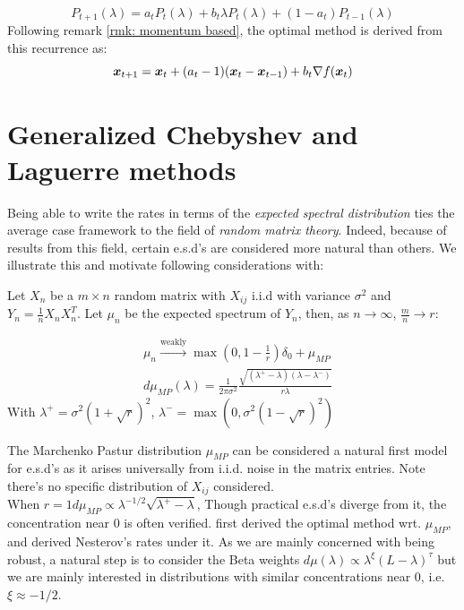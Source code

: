 \documentclass{article}
\begin{document}
\begin{equation}
    P_{t+1}(\lambda)=a_tP_t(\lambda)+b_t\lambda P_t(\lambda)+(1-a_t)P_{t-1}(\lambda)
\end{equation}
Following remark \ref{rmk: momentum based}, the optimal method is derived from this recurrence as:
\begin{equation}
    {\boldsymbol x}_{t+1}={\boldsymbol x}_t+(a_t-1)({\boldsymbol x}_t-{\boldsymbol x}_{t-1})+b_t\nabla f({\boldsymbol x}_t)
\end{equation}



\section{Generalized Chebyshev and Laguerre methods}
Being able to write the rates in terms of the \textit{expected spectral distribution} ties the average case framework to the field of \textit{random matrix theory}. Indeed, because of results from this field, certain e.s.d's are considered more natural than others. We illustrate this and motivate following considerations with:
\begin{prop}
Let $X_n$ be a $m\times n$ random matrix with $X_{ij}$ i.i.d with variance $\sigma^2$ and $Y_n=\frac{1}{n}X_nX_n^T$. Let $\mu_n$ be the expected spectrum of $Y_n$, then, as $n\rightarrow\infty$, $\frac{m}{n} \rightarrow r$:

\begin{align*}
&\mu_n\xrightarrow{\text{weakly}}{}\max(0,1-\frac{1}{r})\delta_0+\mu_{MP} \\
&d\mu_{MP}(\lambda)=\frac{1}{2\pi\sigma^2}\frac{\sqrt{(\lambda^+-\lambda)(\lambda-\lambda^-)}}{r\lambda}
\end{align*}
With $\lambda^+=\sigma^2(1+\sqrt{r})^2$, $\lambda^-=\max(0,\sigma^2(1-\sqrt{r})^2)$

\end{prop}
The Marchenko Pastur distribution $\mu_{MP}$ can be considered a natural first model for e.s.d's as it arises universally from i.i.d. noise in the matrix entries. Note there's no specific distribution of $X_{ij}$ considered. \\
When $r=1 d\mu_{MP}\propto \lambda^{-1/2}\sqrt{\lambda^+-\lambda}$, Though practical e.s.d's diverge from it, the concentration near $0$ is often verified.
\cite{pedregosa2020acceleration} first derived the optimal method wrt. $\mu_{MP}$, and \cite{paquette2020halting} derived Nesterov's rates under it. As we are mainly concerned with being robust, a natural step is to consider the Beta weights $d\mu(\lambda)\propto\lambda^\xi(L-\lambda)^\tau$ but we are mainly interested in distributions with similar concentrations near $0$, i.e. $\xi\approx -1/2$.\\
\end{document}
